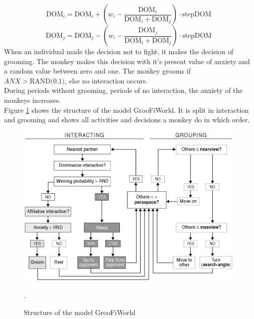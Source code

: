 \documentclass[11pt]{article}
\begin{document}
\begin{equation}
\label{eq:DomUpdate1}
\text{DOM}_i =\text{DOM}_i +(w_i -\frac{\text{DOM}_i}{\text{DOM}_i +\text{DOM}_j})\cdot\text{stepDOM}
\end{equation}
\begin{equation}
\label{eq:DomUpdate2}
\text{DOM}_j =\text{DOM}_j -(w_i -\frac{\text{DOM}_j}{\text{DOM}_i +\text{DOM}_j})\cdot\text{stepDOM}
\end{equation}
When an individual made the decision not to fight, it makes the decision of grooming. The monkey makes this decision with it's present value of anxiety and a random value between zero and one. The monkey grooms if $ANX > \text{RAND(0,1)}$, else no interaction occurs.\\
During periods without grooming, periods of no interaction, the anxiety of the monkeys increases\cite{Puga-Gonzalez2009}.\\

Figure \ref{fig:GrooFiWorld} shows the structure of the model GrooFiWorld. It is split in interaction and grooming and shows all activities and decisions a monkey do in which order.

\begin{figure}[H]
\centering
\includegraphics[scale=0.35]{Photos/Structure}
\caption[Structure of the model GrooFiWorld]{Structure of the model GrooFiWorld\cite{Puga-Gonzalez2009}}.
\label{fig:GrooFiWorld}
\end{figure}
\end{document}
